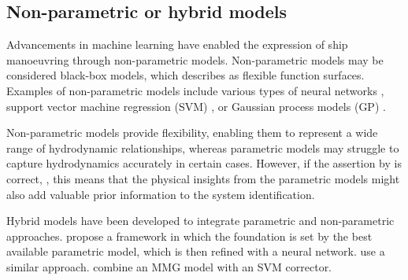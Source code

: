 \subsection{Non-parametric or hybrid models} \label{sec:non-parametric_models}
Advancements in machine learning have enabled the expression of ship manoeuvring through non-parametric models. Non-parametric models may be considered black-box models, which \textcite{ljungPerspectivesSystemIdentification2010} describes as flexible function surfaces.
Examples of non-parametric models include various types of neural networks \cite{rajeshSystemIdentificationNonlinear2008,heBlackBoxModelingShip2020,heNonparametricModelingShip2022}, support vector machine regression (SVM) \cite{chenOnlineModelingPrediction2023,zihaowangKernelbasedSupportVector2020}, or Gaussian process models (GP) \cite{zhangLocallyWeightedNonParametric2021,xueIdentificationPredictionShip2021,xueOnlineIdentificationShip2022}.  

Non-parametric models provide flexibility, enabling them to represent a wide range of hydrodynamic relationships, whereas parametric models may struggle to capture hydrodynamics accurately in certain cases. However, if the assertion by \textcite{revestidoherreroTwostepIdentificationNonlinear2012} is correct, , this means that the physical insights from the parametric models might also add valuable prior information to the system identification.

Hybrid models have been developed to integrate parametric and non-parametric approaches. \textcite{wangIncorporatingApproximateDynamics2021} propose a framework in which the foundation is set by the best available parametric model, which is then refined with a neural network. \textcite{nielsenMachineLearningEnhancement2022} use a similar approach. \textcite{dongMathdataIntegratedPrediction2023a} combine an MMG model with an SVM corrector.



